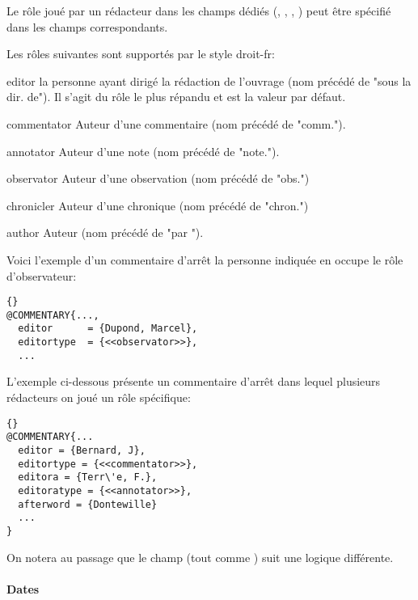 \documentclass{ltxdockit}
\newcommand*{\bibstylename}{droit-fr\xspace}
\begin{document}
Le rôle joué par un rédacteur dans les champs dédiés (\ie {}, , , ) peut être spécifié dans les champs  correspondants. 

Les rôles suivantes sont supportés par le style \bibstylename:

\begin{marglist}
\setlength{\itemsep}{0pt}
\item[editor] la personne ayant dirigé la rédaction de l'ouvrage (nom précédé de "sous la dir. de"). Il s'agit du rôle le plus répandu et est la valeur par défaut.
\item[commentator] Auteur d'une commentaire (nom précédé de "comm.").
\item[annotator] Auteur d'une note (nom précédé de "note.").
\item[observator] Auteur d'une observation (nom précédé de "obs.")
\item[chronicler] Auteur d'une chronique (nom précédé de "chron.")
\item[author] Auteur (nom précédé de "par ").
\end{marglist}
%
Voici l'exemple d'un commentaire d'arrêt la personne indiquée en  occupe le rôle d'observateur:

\begin{lstlisting}[style=bibtex]{}
@COMMENTARY{...,
  editor      = {Dupond, Marcel},
  editortype  = {<<observator>>},
  ...
\end{lstlisting}
%
L'exemple ci-dessous présente un commentaire d'arrêt dans lequel plusieurs rédacteurs on joué un rôle spécifique:

\begin{lstlisting}[style=bibtex]{}
@COMMENTARY{...
  editor = {Bernard, J},
  editortype = {<<commentator>>},
  editora = {Terr\'e, F.},
  editoratype = {<<annotator>>},
  afterword = {Dontewille}
  ...
}
\end{lstlisting}
%
On notera au passage que le champ  (tout comme ) suit une logique différente.

\paragraph{Dates}
\label{dates}
\end{document}
